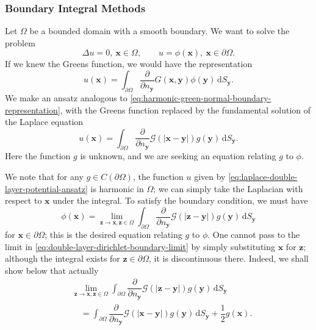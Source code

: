 \subsubsection{Boundary Integral Methods}\label{subsec:boundary-integral-methods}

Let $\Omega$ be a bounded domain with a smooth boundary. We want to solve the problem
\begin{equation}\label{eq:harmonic-dirichlet-boundary-integral-problem}
\Delta u=0,\ \bm{x}\in\Omega,\qquad u=\phi(\bm{x}),\ \bm{x}\in\partial\Omega.
\end{equation}
If we knew the Green\textquotesingle s function, we would have the representation
\begin{equation}\label{eq:harmonic-green-normal-boundary-representation}
u(\bm{x})=\int_{\partial\Omega}\dfrac{\partial}{\partial n_{\bm{y}}}G(\bm{x},\bm{y})\phi(\bm{y})\,\mathrm{d}S_{\bm{y}}.
\end{equation}
We make an ansatz analogous to \eqref{eq:harmonic-green-normal-boundary-representation}, with the Green\textquotesingle s function replaced by the fundamental solution of the Laplace equation
\begin{equation}\label{eq:laplace-double-layer-potential-ansatz}
u(\bm{x})=\int_{\partial\Omega}\dfrac{\partial}{\partial n_{\bm{y}}}\mathcal{G}(|\bm{x}-\bm{y}|)g(\bm{y})\,\mathrm{d}S_{\bm{y}}.
\end{equation}
Here the function $g$ is unknown, and we are seeking an equation relating $g$ to $\phi$.

We note that for any $g\in C(\partial\Omega)$, the function $u$ given by \eqref{eq:laplace-double-layer-potential-ansatz} is harmonic in $\Omega$; we can simply take the Laplacian with respect to $\bm{x}$ under the integral. To satisfy the boundary condition, we must have
\begin{equation}\label{eq:double-layer-dirichlet-boundary-limit}
\phi(\bm{x})=\lim_{\bm{z}\to\bm{x},\bm{z}\in\Omega}\int_{\partial\Omega}\dfrac{\partial}{\partial n_{\bm{y}}}\mathcal{G}(|\bm{z}-\bm{y}|)g(\bm{y})\,\mathrm{d}S_{\bm{y}}
\end{equation}
for $\bm{x}\in\partial\Omega$; this is the desired equation relating $g$ to $\phi$. One cannot pass to the limit in \eqref{eq:double-layer-dirichlet-boundary-limit} by simply substituting $\bm{x}$ for $\bm{z}$; although the integral exists for $\bm{z}\in\partial\Omega$, it is discontinuous there. Indeed, we shall show below that actually
\begin{equation}\label{eq:double-layer-interior-jump-relation}
\begin{aligned}
&\lim_{\bm{z}\to\bm{x},\bm{z}\in\Omega}\int_{\partial\Omega}\dfrac{\partial}{\partial n_{\bm{y}}}\mathcal{G}(|\bm{z}-\bm{y}|)g(\bm{y})\,\mathrm{d}S_{\bm{y}}\\
&\quad=\int_{\partial\Omega}\dfrac{\partial}{\partial n_{\bm{y}}}\mathcal{G}(|\bm{x}-\bm{y}|)g(\bm{y})\,\mathrm{d}S_{\bm{y}}+\dfrac12g(\bm{x}).
\end{aligned}
\end{equation}


